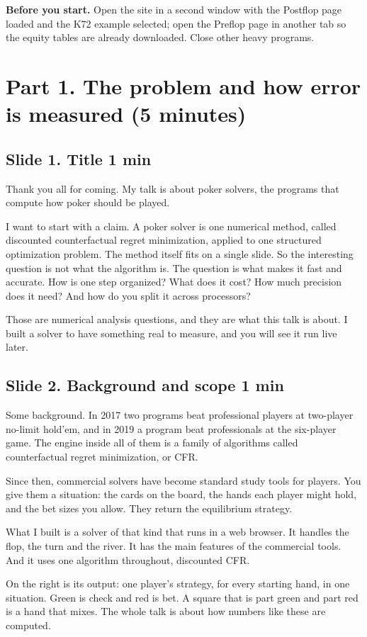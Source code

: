 \documentclass[11pt]{article}
\newcommand{\slidehead}[3]{\subsection*{Slide #1. #2 \hfill {\normalfont\small #3}}}
\begin{document}
\textbf{Before you start.} Open the site in a second window with the Postflop page
loaded and the K72 example selected; open the Preflop page in another tab so the equity tables are already
downloaded. Close other heavy programs.

\section{Part 1. The problem and how error is measured (5 minutes)}

\slidehead{1}{Title}{1 min}
\begin{say}
Thank you all for coming. My talk is about poker solvers, the programs that compute how poker should be played.

I want to start with a claim. A poker solver is one numerical method, called discounted counterfactual regret
minimization, applied to one structured optimization problem. The method itself fits on a single slide. So the
interesting question is not what the algorithm is. The question is what makes it fast and accurate. How is one step
organized? What does it cost? How much precision does it need? And how do you split it across processors?

Those are numerical analysis questions, and they are what this talk is about. I built a solver to have something
real to measure, and you will see it run live later.
\end{say}

\slidehead{2}{Background and scope}{1 min}
\begin{say}
Some background. In 2017 two programs beat professional players at two-player no-limit hold'em, and in 2019 a
program beat professionals at the six-player game. The engine inside all of them is a family of algorithms called
counterfactual regret minimization, or CFR.

Since then, commercial solvers have become standard study tools for players. You give them a situation: the cards
on the board, the hands each player might hold, and the bet sizes you allow. They return the equilibrium strategy.

What I built is a solver of that kind that runs in a web browser. It handles the flop, the turn and the river. It
has the main features of the commercial tools. And it uses one algorithm throughout, discounted CFR.

On the right is its output: one player's strategy, for every starting hand, in one situation. Green is check and
red is bet. A square that is part green and part red is a hand that mixes. The whole talk is about how numbers like
these are computed.
\end{say}
\end{document}
